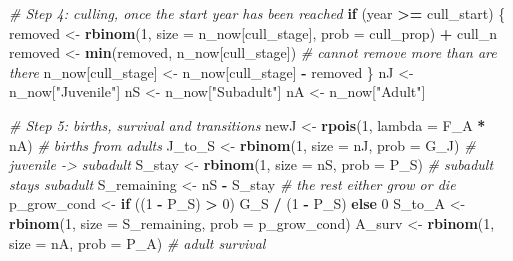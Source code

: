 \documentclass[
  a4paper]{book}
\newenvironment{Shaded}{\begin{snugshade}}{\end{snugshade}}
\newcommand{\AttributeTok}[1]{\textcolor[rgb]{0.13,0.29,0.53}{#1}}
\newcommand{\CommentTok}[1]{\textcolor[rgb]{0.56,0.35,0.01}{\textit{#1}}}
\newcommand{\ControlFlowTok}[1]{\textcolor[rgb]{0.13,0.29,0.53}{\textbf{#1}}}
\newcommand{\DecValTok}[1]{\textcolor[rgb]{0.00,0.00,0.81}{#1}}
\newcommand{\FunctionTok}[1]{\textcolor[rgb]{0.13,0.29,0.53}{\textbf{#1}}}
\newcommand{\NormalTok}[1]{#1}
\newcommand{\OtherTok}[1]{\textcolor[rgb]{0.56,0.35,0.01}{#1}}
\newcommand{\SpecialCharTok}[1]{\textcolor[rgb]{0.81,0.36,0.00}{\textbf{#1}}}
\newcommand{\StringTok}[1]{\textcolor[rgb]{0.31,0.60,0.02}{#1}}
\begin{document}
\begin{Shaded}
\begin{Highlighting}[]
    \CommentTok{\# Step 4: culling, once the start year has been reached}
    \ControlFlowTok{if}\NormalTok{ (year }\SpecialCharTok{\textgreater{}=}\NormalTok{ cull\_start) \{}
\NormalTok{      removed }\OtherTok{\textless{}{-}} \FunctionTok{rbinom}\NormalTok{(}\DecValTok{1}\NormalTok{, }\AttributeTok{size =}\NormalTok{ n\_now[cull\_stage], }\AttributeTok{prob =}\NormalTok{ cull\_prop) }\SpecialCharTok{+}\NormalTok{ cull\_n}
\NormalTok{      removed }\OtherTok{\textless{}{-}} \FunctionTok{min}\NormalTok{(removed, n\_now[cull\_stage]) }\CommentTok{\# cannot remove more than are there}
\NormalTok{      n\_now[cull\_stage] }\OtherTok{\textless{}{-}}\NormalTok{ n\_now[cull\_stage] }\SpecialCharTok{{-}}\NormalTok{ removed}
\NormalTok{    \}}
\NormalTok{    nJ }\OtherTok{\textless{}{-}}\NormalTok{ n\_now[}\StringTok{"Juvenile"}\NormalTok{]}
\NormalTok{    nS }\OtherTok{\textless{}{-}}\NormalTok{ n\_now[}\StringTok{"Subadult"}\NormalTok{]}
\NormalTok{    nA }\OtherTok{\textless{}{-}}\NormalTok{ n\_now[}\StringTok{"Adult"}\NormalTok{]}

    \CommentTok{\# Step 5: births, survival and transitions}
\NormalTok{    newJ }\OtherTok{\textless{}{-}} \FunctionTok{rpois}\NormalTok{(}\DecValTok{1}\NormalTok{, }\AttributeTok{lambda =}\NormalTok{ F\_A }\SpecialCharTok{*}\NormalTok{ nA)          }\CommentTok{\# births from adults}
\NormalTok{    J\_to\_S }\OtherTok{\textless{}{-}} \FunctionTok{rbinom}\NormalTok{(}\DecValTok{1}\NormalTok{, }\AttributeTok{size =}\NormalTok{ nJ, }\AttributeTok{prob =}\NormalTok{ G\_J)    }\CommentTok{\# juvenile {-}\textgreater{} subadult}
\NormalTok{    S\_stay }\OtherTok{\textless{}{-}} \FunctionTok{rbinom}\NormalTok{(}\DecValTok{1}\NormalTok{, }\AttributeTok{size =}\NormalTok{ nS, }\AttributeTok{prob =}\NormalTok{ P\_S)    }\CommentTok{\# subadult stays subadult}
\NormalTok{    S\_remaining }\OtherTok{\textless{}{-}}\NormalTok{ nS }\SpecialCharTok{{-}}\NormalTok{ S\_stay                    }\CommentTok{\# the rest either grow or die}
\NormalTok{    p\_grow\_cond }\OtherTok{\textless{}{-}} \ControlFlowTok{if}\NormalTok{ ((}\DecValTok{1} \SpecialCharTok{{-}}\NormalTok{ P\_S) }\SpecialCharTok{\textgreater{}} \DecValTok{0}\NormalTok{) G\_S }\SpecialCharTok{/}\NormalTok{ (}\DecValTok{1} \SpecialCharTok{{-}}\NormalTok{ P\_S) }\ControlFlowTok{else} \DecValTok{0}
\NormalTok{    S\_to\_A }\OtherTok{\textless{}{-}} \FunctionTok{rbinom}\NormalTok{(}\DecValTok{1}\NormalTok{, }\AttributeTok{size =}\NormalTok{ S\_remaining, }\AttributeTok{prob =}\NormalTok{ p\_grow\_cond)}
\NormalTok{    A\_surv }\OtherTok{\textless{}{-}} \FunctionTok{rbinom}\NormalTok{(}\DecValTok{1}\NormalTok{, }\AttributeTok{size =}\NormalTok{ nA, }\AttributeTok{prob =}\NormalTok{ P\_A)    }\CommentTok{\# adult survival}


\end{Highlighting}
\end{Shaded}
\end{document}
